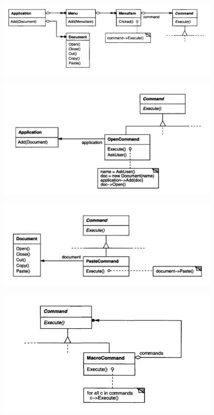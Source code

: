 \begin{multicols}{2}
    \begin{figure}[H]
        \centering
        \includegraphics[width=1\linewidth]{assets/pattern/command/command-esempio-1.png}
    \end{figure}
    \begin{figure}[H]
        \centering
        \includegraphics[width=1\linewidth]{assets/pattern/command/command-esempio-3.png}
    \end{figure}
    \columnbreak
    \begin{figure}[H]
        \centering
        \includegraphics[width=1\linewidth]{assets/pattern/command/command-esempio-2.png}
    \end{figure}
    \begin{figure}[H]
        \centering
        \includegraphics[width=1\linewidth]{assets/pattern/command/command-esempio-4.png}

\end{figure}
\end{multicols}
